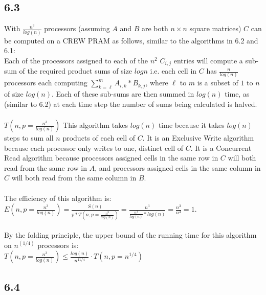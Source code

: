 \documentclass[letterpaper,notitlepage,twoside]{article}
\begin{document}
\subsection*{6.3}
With $\frac{n^3}{log(n)}$ processors (assuming $A$ and $B$ are both $n \times n$ square matrices) $C$ can be computed on a CREW PRAM as follows, similar to the algorithms in 6.2 and 6.1: \\
Each of the processors assigned to each of the $n^2$ $C_{i, j}$ entries will compute a sub-sum of the required product sums of size $log n$ i.e. each cell in $C$ has $\frac{n}{log(n)}$ processors each computing $\sum_{k = \ell}^{m}  A_{i, k} * B_{k, j}$, where $\ell$ to $m$ is a subset of $1$ to $n$ of size $log(n)$. Each of these sub-sums are then summed in $log(n)$ time, as (similar to 6.2) at each time step the number of sums being calculated is halved. \\\\
$T(n, p = \frac{n^3}{log(n)})$ This algorithm takes $log(n)$ time because it takes $log(n)$ steps to sum all $n$ products of each cell of $C$. It is an Exclusive Write algorithm because each processor only writes to one, distinct cell of $C$. It is a Concurrent Read algorithm because processors assigned cells in the same row in $C$ will both read from the same row in $A$, and processors assigned cells in the same column in $C$ will both read from the same column in $B$. \\\\
The efficiency of this algorithm is: $E(n, p = \frac{n^{3}}{log(n)}) = \frac{S(n)}{p * T(n, p = \frac{n^3}{log(n)})} = \frac{n^3}{\frac{n^3}{log(n)} * log(n)} = \frac{n^3}{n^3} = 1$. \\\\
By the folding principle, the upper bound of the running time for this algorithm on $n^(1/4)$ processors is:\\
$T(n, p = \frac{n^{3}}{log(n)}) \leq \frac{log(n)}{n^{11/4}} \cdot T(n, p = n^{1/4})$

\subsection*{6.4}
\end{document}

